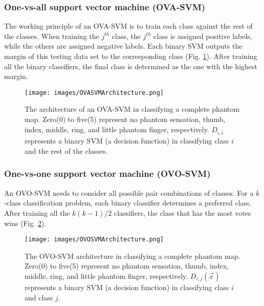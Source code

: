 \subsubsection{One-vs-all support vector machine (OVA-SVM)}
The working principle of an OVA-SVM is to train each class against the rest of the classes. When training the $j^{th}$ class, the $j^{th}$ class is assigned positive labels, while the others are assigned negative labels. Each binary SVM outputs the margin of this testing data set to the corresponding class (Fig. \ref{Fig:OVASVM_architecture}). After training all the binary classifiers, the final class is determined as the one with the highest margin.

\begin{figure}[htb]
    \centering
    \texttt{[image: images/OVASVMArchitecture.png]}
    \caption{The architecture of an OVA-SVM in classifying a complete phantom map. Zero(0) to five(5) represent no phantom sensation, thumb, index, middle, ring, and little phantom finger, respectively. $D_{i,\bar{i}}$ represents a binary SVM (a decision function) in classifying class $i$ and the rest of the classes.}
    \label{Fig:OVASVM_architecture}
\end{figure}

\subsubsection{One-vs-one support vector machine (OVO-SVM)}
\label{subsubsec:OVO}
An OVO-SVM needs to consider all possible pair combinations of classes. 
For a $k$-class classification problem, each binary classifier determines a preferred class. After training all the $k(k-1)/2$ classifiers, the class that has the most votes wins (Fig. \ref{Fig:OVOSVM_architecture}). 

\begin{figure}[htb]
    \centering
    \texttt{[image: images/OVOSVMArchitecture.png]}
    \caption{The OVO-SVM architecture in classifying a complete phantom map. Zero(0) to five(5) represent no phantom sensation, thumb, index, middle, ring, and little phantom finger, respectively. $D_{i,j}(\vec{x})$ represents a binary SVM (a decision function) in classifying class $i$ and class $j$.}
    \label{Fig:OVOSVM_architecture}
\end{figure}


